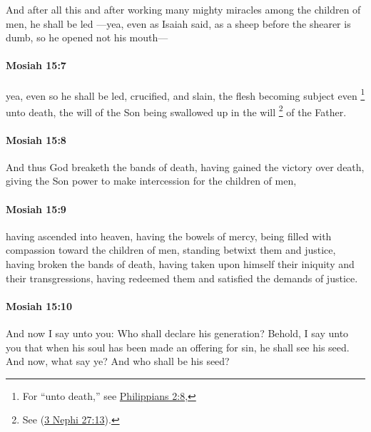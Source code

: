 			And after all this
			and after working many mighty miracles among the children of men,
			he shall be led
			---yea, even as Isaiah said,
			as a sheep before the shearer is dumb,
			so he opened not his mouth---

		\paragraph{Mosiah 15:7} %
			\label{MOSIAH-15-7}
			
			yea, even so he shall be led, crucified, and slain,
			the flesh becoming subject even
				\footnote{%
					For ``unto death,'' see \hyperref[PHILIPPIANS-2-8]{Philippians 2:8},
					}%
			unto death,
			the will of the Son being swallowed up in the will%
				\footnote{%
					See (\hyperref[3NEPHI-27-13]{3 Nephi 27:13}).
					}
			of the Father.

		\paragraph{Mosiah 15:8} %
			\label{MOSIAH-15-8}

			And thus God breaketh the bands of death,
			having gained the victory over death,
			giving the Son power to make intercession for the children of men,

		\paragraph{Mosiah 15:9} %
			\label{MOSIAH-15-9}

			having ascended into heaven,
			having the bowels of mercy,
			being filled with compassion toward the children of men,
			standing betwixt them and justice,
			having broken the bands of death,
			having taken upon himself their iniquity and their transgressions,
			having redeemed them and satisfied the demands of justice.

		\paragraph{Mosiah 15:10} %
			\label{MOSIAH-15-10}

			And now I say unto you:
			Who shall declare his generation?
			Behold, I say unto you that
			when his soul has been made an offering for sin,
			he shall see his seed.
			And now, what say ye?
			And who shall be his seed?

